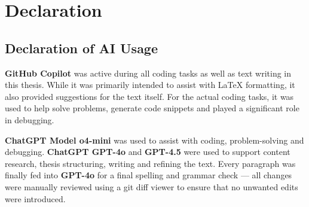 


\section{Declaration}
\label{declaration}

\subsection{Declaration of AI Usage}%

\textbf{GitHub Copilot} was active during all coding tasks as well as text writing in this thesis.
While it was primarily intended to assist with LaTeX formatting, it also provided suggestions for the text itself.
For the actual coding tasks, it was used to help solve problems, generate code snippets and played a significant role in debugging.

\textbf{ChatGPT Model o4-mini} was used to assist with coding, problem-solving and debugging.
\textbf{ChatGPT GPT-4o} and \textbf{GPT-4.5} were used to support content research, thesis structuring, writing and refining the text.
Every paragraph was finally fed into \textbf{GPT-4o} for a final spelling and grammar check --- all changes were manually reviewed using a git diff viewer to ensure that no unwanted edits were introduced.


\newpage
{}

